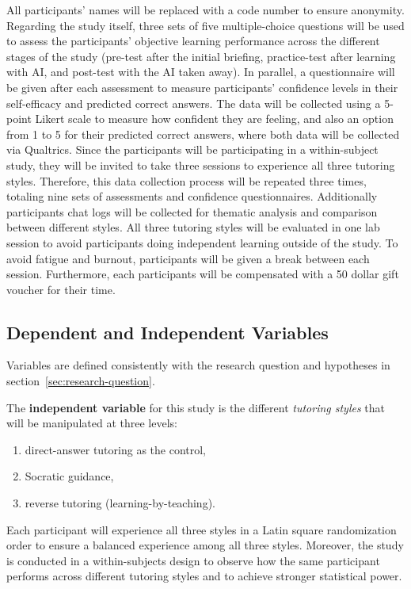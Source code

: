 \documentclass{article}
\begin{document}
All participants' names will be replaced with a code number to ensure anonymity. 
Regarding the study itself, three sets of five multiple-choice questions will be used to assess the participants’ 
objective learning performance across the different stages of the study (pre-test after the initial briefing, 
practice-test after learning with AI, and post-test with the AI taken away). 
In parallel, a questionnaire will be given after each assessment to measure 
participants’ confidence levels in their self-efficacy and predicted correct answers. 
The data will be collected using a 5-point Likert scale to measure how confident they are feeling, 
and also an option from 1 to 5 for their predicted correct answers, where both data will be collected via Qualtrics.
Since the participants 
will be participating in a within-subject study, they will be invited to take three sessions 
to experience all three tutoring styles. Therefore, this data collection process will be repeated 
three times, totaling nine sets of assessments and confidence questionnaires. Additionally participants 
chat logs will be collected for thematic analysis and comparison between different styles. All three tutoring styles 
will be evaluated in one lab session to avoid participants doing independent learning outside of the study. 
To avoid fatigue and burnout, participants will be given a break between each session. Furthermore, each participants 
will be compensated with a 50 dollar gift voucher for their time.

\subsection{Dependent and Independent Variables}

Variables are defined consistently with the research question and hypotheses in section~\ref{sec:research-question}.

The \textbf{independent variable} for this study is the different \emph{tutoring styles} that will be 
manipulated at three levels: 
\begin{enumerate}
    \item direct-answer tutoring as the control, 
    \item Socratic guidance, 
    \item reverse tutoring (learning-by-teaching). 
\end{enumerate}
Each participant will experience all three styles in a Latin square randomization 
order to ensure a balanced experience among all three styles. 
Moreover, the study is conducted in a within-subjects design to observe 
how the same participant performs across 
different tutoring styles and to achieve stronger statistical power.
\end{document}
